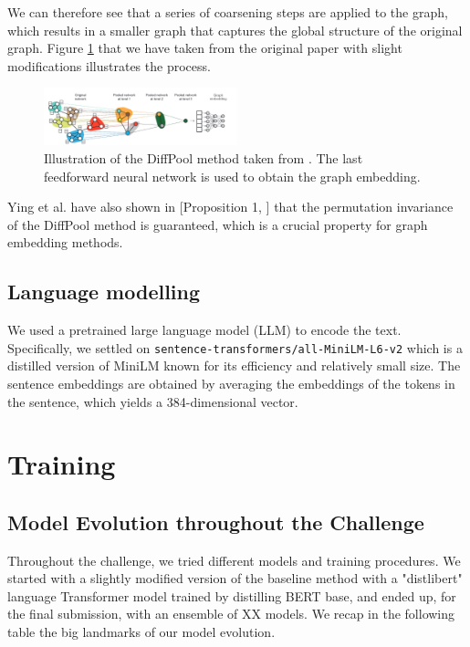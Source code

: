 \documentclass[switch, 12pt]{article}
\begin{document}
\begin{multicols}{2}
    We can therefore see that a series of coarsening steps are applied to the graph, which results in a smaller graph that captures the global structure of the original graph. Figure \ref{fig:diffpool} that we have taken from the original paper \cite{ying-2018} with slight modifications illustrates the process.

    \begin{figure}[H]
        \centering
        \includegraphics[width=0.5\textwidth]{figures/diffpool.jpg}
        \caption{Illustration of the DiffPool method taken from \cite{ying-2018}. The last feedforward neural network is used to obtain the graph embedding.}
        \label{fig:diffpool}
    \end{figure}
    Ying et al. have also shown in [Proposition 1, \cite{ying-2018}] that the permutation invariance of the DiffPool method is guaranteed, which is a crucial property for graph embedding methods.
    \subsection{Language modelling}

    We used a pretrained large language model (LLM) to encode the text. Specifically, we settled on \texttt{sentence-transformers/all-MiniLM-L6-v2} which is a distilled version of MiniLM \cite{wang-2020} known for its efficiency and relatively small size. The sentence embeddings are obtained by averaging the embeddings of the tokens in the sentence, which yields a 384-dimensional vector.

    \section{Training}

    \subsection{Model Evolution throughout the Challenge}
    Throughout the challenge, we tried different models and training procedures. We started with a slightly modified version of the baseline method with a "distlibert" language Transformer model trained by distilling BERT base, and ended up, for the final submission, with an ensemble of XX models. We recap in the following table the big landmarks of our model evolution.


\end{multicols}
\end{document}
